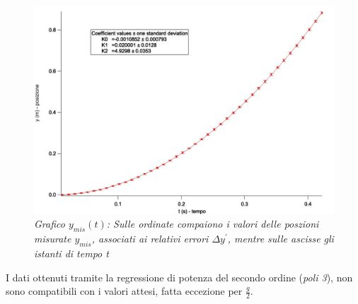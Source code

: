 \documentclass[12pt, a4paper]{article}
\begin{document}
    \begin{figure}[h!]
\centering
\includegraphics[width=170mm]{Immagini/Graph4 non comp.jpg}
\caption{\textit{{\footnotesize{Grafico $y_{mis}(t)$:  Sulle ordinate compaiono i valori delle poszioni misurate $y_{mis}$, associati ai relativi errori  \textit{$\Delta y^{'}$}, mentre sulle ascisse gli istanti di tempo \textit{t}}}}}
\label{Grafico parabolico}
\end{figure}

I dati ottenuti tramite la regressione di potenza del secondo ordine (\textit{poli 3}), non sono compatibili con i valori attesi, fatta eccezione per $\displaystyle{\frac{g}{2}}$.
\end{document}
